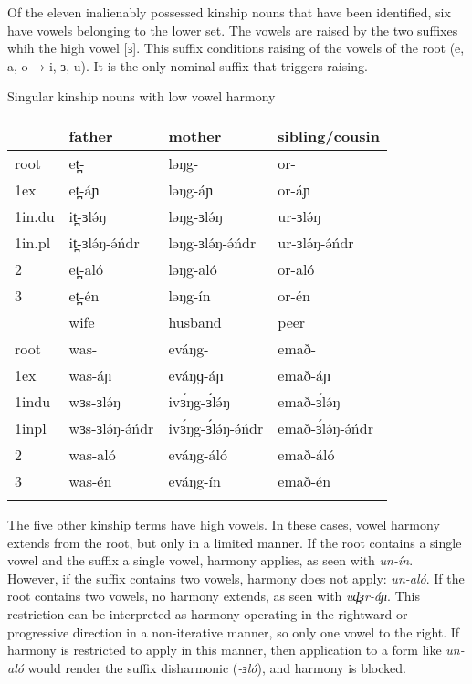 Of the eleven inalienably possessed kinship nouns that have been identified, six have vowels belonging to the lower set. The vowels are raised by the two suffixes whih the high vowel [ɜ]. This suffix conditions raising of the vowels of the root (e, a, o → i, ɜ, u). It is the only nominal suffix that triggers raising.  %

\ea Singular kinship nouns with low vowel harmony\\
\begin{tabular}[t]{llll}
\lsptoprule
		& father 	& mother 		&	sibling/cousin	\\
	\midrule
root	& et̪-		&ləŋg-			&or- \\
1ex 		&et̪-áɲ		&ləŋg-áɲ		&or-áɲ		 \\
1in.du	&it̪-ɜlə́ŋ	&ləŋg-ɜlə́ŋ		&ur-ɜlə́ŋ \\
1in.pl	&it̪-ɜlə́ŋ-ə́ńdr&	ləŋg-ɜlə́ŋ-ə́ńdr&	ur-ɜlə́ŋ-ə́ńdr\\
2		&et̪-aló		&	ləŋg-aló	&or-aló\\
3		&et̪-én		&ləŋg-ín		&or-én\\
	\midrule
	&	wife	&	husband &	peer \\
	\midrule
root	&	was-		&	eváŋg-		& emað-	\\	 
1ex		&	was-áɲ		&	eváŋɡ-áɲ	& emað-áɲ\\
1indu	& wɜs-ɜlə́ŋ		&	ivɜ́ŋg-ɜ́lə́ŋ	 & emað-ɜ́lə́ŋ\\
1inpl	& wɜs-ɜlə́ŋ-ə́ńdr	&	ivɜ́ŋg-ɜ́lə́ŋ-ə́ńdr	 & emað-ɜ́lə́ŋ-ə́ńdr	\\
2		&	was-aló		&	eváŋg-áló	 & emað-áló\\
3		&	was-én		&	eváŋg-ín	 & emað-én\\
	\lspbottomrule
\end{tabular}	
\z 

The five other kinship terms have high vowels. In these cases, vowel harmony extends from the root, but only in a limited manner. If the root contains a single vowel and the suffix a single vowel, harmony applies, as seen with \textit{un-ín}. However, if the suffix contains two vowels, harmony does not apply: \textit{un-aló}. If the root contains two vowels, no harmony extends, as seen with \textit{ud̪ɜr-áɲ}. This restriction can be interpreted as harmony operating in the rightward or progressive direction in a non-iterative manner, so only one vowel to the right. If harmony is restricted to apply in this manner, then application to a form like \textit{un-aló} would render the suffix disharmonic (\textit{-ɜló}), and harmony is blocked. 

